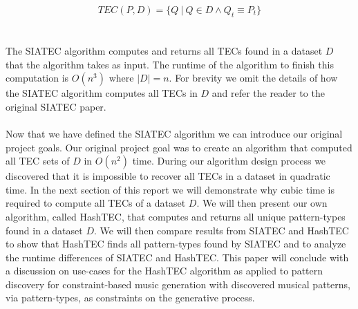 \documentclass[12pt]{article}
\begin{document}
$$TEC(P, D) = \{Q ~|~ Q \in D \land Q_t \equiv P_t\}$$
\\
\\The SIATEC algorithm computes and returns all TECs found in a dataset $D$ that the algorithm takes as input. The runtime of the algorithm to finish this computation is $O(n^3)$ where $|D| = n$. For brevity we omit the details of how the SIATEC algorithm computes all TECs in $D$ and refer the reader to the original SIATEC paper.\cite{SIATEC_Paper}
\\
\\Now that we have defined the SIATEC algorithm we can introduce our original project goals. Our original project goal was to create an algorithm that computed all TEC sets of $D$ in $O(n^2)$ time. During our algorithm design process we discovered that it is impossible to recover all TECs in a dataset in quadratic time. In the next section of this report we will demonstrate why cubic time is required to compute all TECs of a dataset $D$. We will then present our own algorithm, called HashTEC, that computes and returns all unique pattern-types found in a dataset $D$. We will then compare results from SIATEC and HashTEC to show that HashTEC finds all pattern-types found by SIATEC and to analyze the runtime differences of SIATEC and HashTEC. This paper will conclude with a discussion on use-cases for the HashTEC algorithm as applied to pattern discovery for constraint-based music generation with discovered musical patterns, via pattern-types, as constraints on the generative process.
\end{document}
